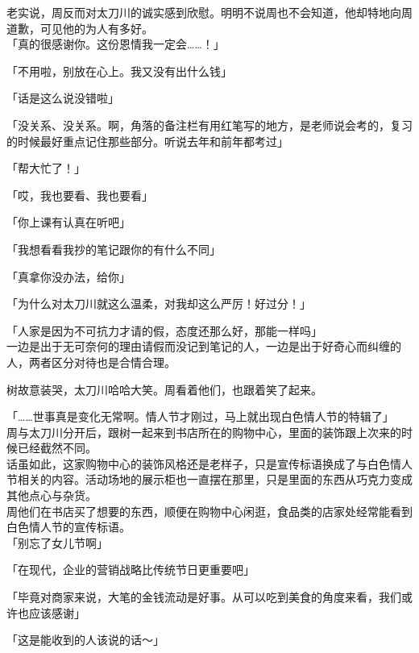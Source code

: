 老实说，周反而对太刀川的诚实感到欣慰。明明不说周也不会知道，他却特地向周道歉，可见他的为人有多好。\\

「真的很感谢你。这份恩情我一定会……！」

「不用啦，别放在心上。我又没有出什么钱」

「话是这么说没错啦」

「没关系、没关系。啊，角落的备注栏有用红笔写的地方，是老师说会考的，复习的时候最好重点记住那些部分。听说去年和前年都考过」

「帮大忙了！」

「哎，我也要看、我也要看」

「你上课有认真在听吧」

「我想看看我抄的笔记跟你的有什么不同」

「真拿你没办法，给你」

「为什么对太刀川就这么温柔，对我却这么严厉！好过分！」

「人家是因为不可抗力才请的假，态度还那么好，那能一样吗」\\

一边是出于无可奈何的理由请假而没记到笔记的人，一边是出于好奇心而纠缠的人，两者区分对待也是合情合理。

树故意装哭，太刀川哈哈大笑。周看着他们，也跟着笑了起来。\\

\vspace{2\baselineskip}

「……世事真是变化无常啊。情人节才刚过，马上就出现白色情人节的特辑了」\\

周与太刀川分开后，跟树一起来到书店所在的购物中心，里面的装饰跟上次来的时候已经截然不同。\\

话虽如此，这家购物中心的装饰风格还是老样子，只是宣传标语换成了与白色情人节相关的内容。活动场地的展示柜也一直摆在那里，只是里面的东西从巧克力变成其他点心与杂货。\\

周他们在书店买了想要的东西，顺便在购物中心闲逛，食品类的店家处经常能看到白色情人节的宣传标语。\\

「别忘了女儿节啊」

「在现代，企业的营销战略比传统节日更重要吧」

「毕竟对商家来说，大笔的金钱流动是好事。从可以吃到美食的角度来看，我们或许也应该感谢」

「这是能收到的人该说的话～」

